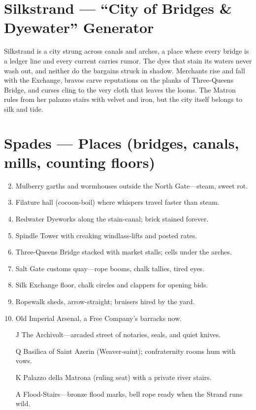 \section{Silkstrand --- ``City of Bridges \& Dyewater'' Generator}
\label{chap:silkstrand}

Silkstrand is a city strung across canals and arches, a place where every bridge is a ledger line and every current carries rumor. The dyes that stain its waters never wash out, and neither do the bargains struck in shadow. Merchants rise and fall with the Exchange, bravos carve reputations on the planks of Three-Queens Bridge, and curses cling to the very cloth that leaves the looms. The Matron rules from her palazzo stairs with velvet and iron, but the city itself belongs to silk and tide.

\section*{Spades --- Places (bridges, canals, mills, counting floors)}
\label{sec:silkstrand-places}
\begin{enumerate}
\setcounter{enumi}{1}
\item Mulberry garths and wormhouses outside the North Gate---steam, sweet rot.
\item Filature hall (cocoon-boil) where whispers travel faster than steam.
\item Redwater Dyeworks along the stain-canal; brick stained forever.
\item Spindle Tower with creaking windlass-lifts and posted rates.
\item Three-Queens Bridge stacked with market stalls; cells under the arches.
\item Salt Gate customs quay---rope booms, chalk tallies, tired eyes.
\item Silk Exchange floor, chalk circles and clappers for opening bids.
\item Ropewalk sheds, arrow-straight; bruisers hired by the yard.
\item Old Imperial Arsenal, a Free Company's barracks now.
\item[J] The Archivolt---arcaded street of notaries, seals, and quiet knives.
\item[Q] Basilica of Saint Azerin (Weaver-saint); confraternity rooms hum with vows.
\item[K] Palazzo della Matrona (ruling seat) with a private river stairs.
\item[A] Flood-Stairs---bronze flood marks, bell rope ready when the Strand runs wild.
\end{enumerate}

